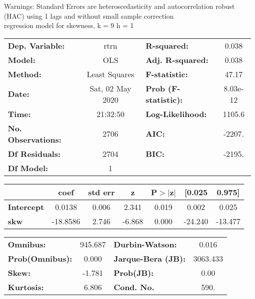 Warnings: \newline
 [1] Standard Errors are heteroscedasticity and autocorrelation robust (HAC) using 1 lags and without small sample correction\\ 

regression model for skewness, k = 9 h = 1\begin{center}
\begin{tabular}{lclc}
\toprule
\textbf{Dep. Variable:}    &       rtrn       & \textbf{  R-squared:         } &     0.038   \\
\textbf{Model:}            &       OLS        & \textbf{  Adj. R-squared:    } &     0.038   \\
\textbf{Method:}           &  Least Squares   & \textbf{  F-statistic:       } &     47.17   \\
\textbf{Date:}             & Sat, 02 May 2020 & \textbf{  Prob (F-statistic):} &  8.03e-12   \\
\textbf{Time:}             &     21:32:50     & \textbf{  Log-Likelihood:    } &    1105.6   \\
\textbf{No. Observations:} &        2706      & \textbf{  AIC:               } &    -2207.   \\
\textbf{Df Residuals:}     &        2704      & \textbf{  BIC:               } &    -2195.   \\
\textbf{Df Model:}         &           1      & \textbf{                     } &             \\
\bottomrule
\end{tabular}
\begin{tabular}{lcccccc}
                   & \textbf{coef} & \textbf{std err} & \textbf{z} & \textbf{P$> |$z$|$} & \textbf{[0.025} & \textbf{0.975]}  \\
\midrule
\textbf{Intercept} &       0.0138  &        0.006     &     2.341  &         0.019        &        0.002    &        0.025     \\
\textbf{skw}       &     -18.8586  &        2.746     &    -6.868  &         0.000        &      -24.240    &      -13.477     \\
\bottomrule
\end{tabular}
\begin{tabular}{lclc}
\textbf{Omnibus:}       & 945.687 & \textbf{  Durbin-Watson:     } &    0.016  \\
\textbf{Prob(Omnibus):} &   0.000 & \textbf{  Jarque-Bera (JB):  } & 3063.433  \\
\textbf{Skew:}          &  -1.781 & \textbf{  Prob(JB):          } &     0.00  \\
\textbf{Kurtosis:}      &   6.806 & \textbf{  Cond. No.          } &     590.  \\
\bottomrule
\end{tabular}
\end{center}

